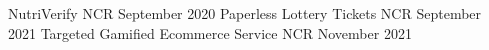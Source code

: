 {
\patentApplication
{NutriVerify}
{NCR}
{September 2020}
}
{
\patentApplication
{Paperless Lottery Tickets}
{NCR}
{September 2021}
}
{
\patentApplication
{Targeted Gamified Ecommerce Service}
{NCR}
{November 2021}
}
